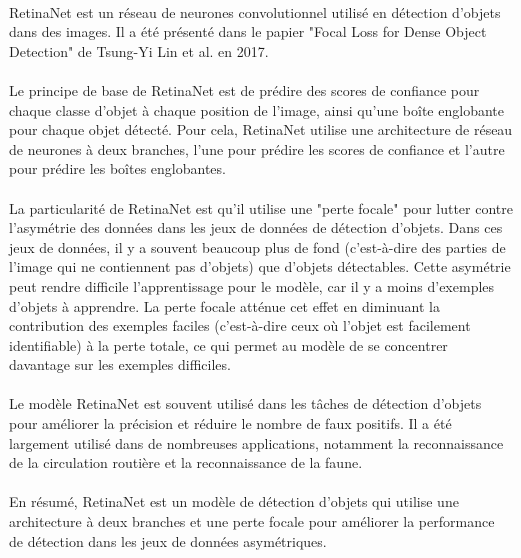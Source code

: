 \paragraph{} RetinaNet est un réseau de neurones convolutionnel utilisé en détection d'objets dans des images. Il a été présenté dans le papier "Focal Loss for Dense Object Detection" de Tsung-Yi Lin et al. en 2017.

\paragraph{} Le principe de base de RetinaNet est de prédire des scores de confiance pour chaque classe d'objet à chaque position de l'image, ainsi qu'une boîte englobante pour chaque objet détecté. Pour cela, RetinaNet utilise une architecture de réseau de neurones à deux branches, l'une pour prédire les scores de confiance et l'autre pour prédire les boîtes englobantes.

\paragraph{} La particularité de RetinaNet est qu'il utilise une "perte focale" pour lutter contre l'asymétrie des données dans les jeux de données de détection d'objets. Dans ces jeux de données, il y a souvent beaucoup plus de fond (c'est-à-dire des parties de l'image qui ne contiennent pas d'objets) que d'objets détectables. Cette asymétrie peut rendre difficile l'apprentissage pour le modèle, car il y a moins d'exemples d'objets à apprendre. La perte focale atténue cet effet en diminuant la contribution des exemples faciles (c'est-à-dire ceux où l'objet est facilement identifiable) à la perte totale, ce qui permet au modèle de se concentrer davantage sur les exemples difficiles.

\paragraph{} Le modèle RetinaNet est souvent utilisé dans les tâches de détection d'objets pour améliorer la précision et réduire le nombre de faux positifs. Il a été largement utilisé dans de nombreuses applications, notamment la reconnaissance de la circulation routière et la reconnaissance de la faune.

\paragraph{} En résumé, RetinaNet est un modèle de détection d'objets qui utilise une architecture à deux branches et une perte focale pour améliorer la performance de détection dans les jeux de données asymétriques.


